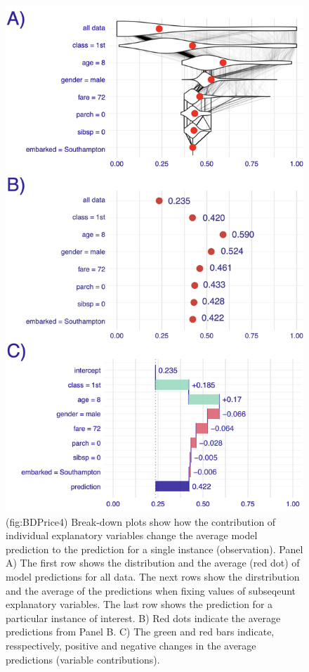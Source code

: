 \documentclass[12pt,]{krantz}
\begin{document}
\begin{figure}

{\centering \includegraphics[width=0.8\linewidth]{figure/break_down_distr} 

}

\caption{(fig:BDPrice4) Break-down plots show how the contribution of individual explanatory variables change the average model prediction to the prediction for a single instance (observation). Panel A) The first row shows the distribution and the average (red dot) of model predictions for all data. The next rows show the dirstribution and the average of the predictions when fixing values of subseqeunt explanatory variables. The last row shows the prediction for a particular instance of interest. B) Red dots indicate the average predictions from Panel B. C) The green and red bars indicate, resspectively, positive and negative changes in the average predictions (variable contributions). }\label{fig:BDPrice4}
\end{figure}
\end{document}
